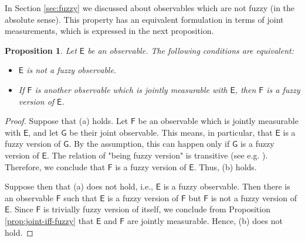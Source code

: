\documentclass[12pt]{amsart}
\newtheorem{proposition}{Proposition}
\theoremstyle{definition}
\newcommand{\Eo}{\mathsf{E}} %
\newcommand{\Fo}{\mathsf{F}} %
\newcommand{\Go}{\mathsf{G}} %
\begin{document}
In Section \ref{sec:fuzzy} we discussed about observables which are not fuzzy (in the absolute sense). This property has an equivalent formulation in terms of joint measurements, which is expressed in the next proposition.

\begin{proposition}
Let $\Eo$ be an observable. The following conditions are equivalent:
\begin{itemize}
\item[(a)] $\Eo$ is not a fuzzy observable.
\item[(b)] If $\Fo$ is another observable which is jointly measurable with $\Eo$, then $\Fo$ is a fuzzy version of $\Eo$.
\end{itemize}
\end{proposition}

\begin{proof}
Suppose that (a) holds. Let $\Fo$ be an observable which is jointly measurable with $\Eo$, and let $\Go$ be their joint observable. This means, in particular, that $\Eo$ is a fuzzy version of $\Go$. By the assumption, this can happen only if $\Go$ is a fuzzy version of $\Eo$. The relation of "being fuzzy version" is transitive (see e.g. \cite{Heinonen05}). Therefore, we conclude that $\Fo$ is a fuzzy version of $\Eo$. Thus, (b) holds.

Suppose then that (a) does not hold, i.e., $\Eo$ is a fuzzy observable. Then there is an observable $\Fo$ such that $\Eo$ is a fuzzy version of $\Fo$ but $\Fo$ is not a fuzzy version of $\Eo$. Since $\Fo$ is trivially fuzzy version of itself, we conclude from Proposition \ref{prop:joint-iff-fuzzy} that $\Eo$ and $\Fo$ are jointly measurable. Hence, (b) does not hold.
\end{proof}
\end{document}
